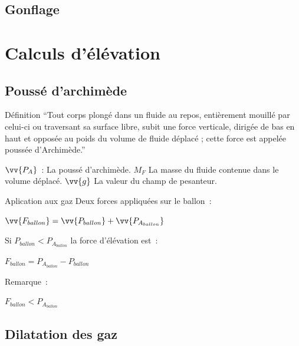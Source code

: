 \documentclass{beamer}
\begin{document}
\subsection{Gonflage}

\section{Calculs d'élévation}

\subsection{Poussé d'archimède}

\begin{frame}{Définition}
  \enquote{Tout corps plongé dans un fluide au repos, entièrement mouillé par celui-ci ou traversant sa surface libre, subit une force verticale, dirigée de bas en haut et opposée au poids du volume de fluide déplacé ; cette force est appelée poussée d'Archimède.}
  \bigbreak
  \begin{center}
  \end{center}
  $\vv{P_A}$~: La poussé d'archimède. $M_F$ La masse du fluide contenue dans le volume déplacé. $\vv{g}$ La valeur du champ de pesanteur.
\end{frame}

\begin{frame}{Aplication aux gaz}
  Deux forces appliquées sur le ballon~: \\
  \begin{center}
    $\displaystyle{\vv{F_{ballon}} = \vv{P_{ballon}} + \vv{P_{A_{ballon}}}}$ \\
  \end{center}
  Si $P_{ballon} < P_{A_{ballon}}$ la force d'élévation est~:
  \begin{center}
    $\displaystyle{F_{ballon} = P_{A_{ballon}} - P_{ballon}}$ \\
  \end{center}
  Remarque~:\\
  \begin{center}
    $F_{ballon} < P_{A_{ballon}}$
  \end{center}
\end{frame}

\subsection{Dilatation des gaz}
\end{document}
